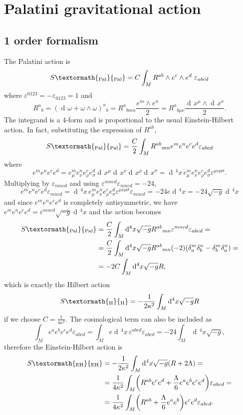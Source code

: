\documentclass[a4paper,12pt]{book}
\newcommand{\ped}[1]{\textormath{\textsubscript{#1}}{_{\mathrm{#1}}}}
\newcommand{\ap}[1]{\textormath{\textsuperscript{#1}}{^{\mathrm{#1}}}}
\newcommand{\dd}{\mathop{\mathrm{d}\!}{}}
\theoremstyle{definition}
\theoremstyle{remark}
\begin{document}
\section{Palatini gravitational action}
\subsection{1\ap{st} order formalism}
\label{subsec:pal1vierbein}
The Palatini action is 
\[S\ped{Pal}=C\int_MR^{ab}\wedge e^c\wedge e^d\ \varepsilon_{abcd}\]
where $\varepsilon^{0123}=-\varepsilon_{0123}=1$ and
\[R^a{}_b=(\dd\omega+\omega\wedge\omega)^a{}_b=R^a{}_{bmn}\frac{e^m\wedge e^n}{2}=R^a{}_{b\mu\nu}\frac{\dd x^\mu\wedge\dd x^\nu}{2}.\]
The integrand is a 4-form and is proportional to the usual Einstein-Hilbert action. In fact, substituting the expression of $R^{ab}$,
\[S\ped{Pal}=\frac{C}{2}\int_MR^{ab}{}_{mn}e^me^ne^ce^d\varepsilon_{abcd}\]
where
\[e^me^ne^ce^d=e^m_\mu e^n_\nu e^c_\rho e^d_\sigma\dd x^\mu\dd x^\nu\dd x^\rho\dd x^\sigma=\dd^4x\,e^m_\mu e^n_\nu e^c_\rho e^d_\sigma \varepsilon^{\mu\nu\rho\sigma}.\]
Multiplying by $\varepsilon_{mncd}$ and using $\varepsilon^{mncd}\varepsilon_{mncd}=-24$,
\[e^me^ne^ce^d\varepsilon_{mncd}=\dd^4x\,e^m_\mu e^n_\nu e^c_\rho e^d_\sigma \varepsilon^{\mu\nu\rho\sigma}\varepsilon_{mncd}=-24e\dd^4 x=-24\sqrt{-g}\dd^4x\]
and since $e^me^ne^ce^d$ is completely antisymmetric, we have $e^me^ne^ce^d=\varepsilon^{mncd}\sqrt{-g}\dd^4x$ and the action becomes
\begin{align*}
S\ped{Pal}&=\frac{C}{2}\int_M\dd^4x\sqrt{-g}R^{ab}{}_{mn}\varepsilon^{mncd}\varepsilon_{abcd}=\\
&=\frac{C}{2}\int_M\dd^4x\sqrt{-g}R^{ab}{}_{mn}(-2)(\delta^m_a\delta^n_b-\delta^m_b\delta^n_a)=\\
&=-2C\int_M\dd^4x\sqrt{-g}R,
\end{align*}
which is exactly the Hilbert action
\[S\ped{H}=-\frac{1}{2\kappa^2}\int_M\dd^4x\sqrt{-g}R\]
if we choose $C=\frac{1}{4\kappa^2}$. The cosmological term can also be included as
\[\int_Me^ae^be^ce^d\varepsilon_{abcd}=\int_M e\dd^4x\,\varepsilon^{abcd}\varepsilon_{abcd}=-24\int_M\dd^4x\sqrt{-g},\]
therefore the Einstein-Hilbert action is
\begin{align}
\label{eqn:palatinieh}
S\ped{EH}&=-\frac{1}{2\kappa^2}\int_M\dd^4x\sqrt{-g}(R+2\Lambda)=\\
&=\frac{1}{4\kappa^2}\int_M\biggl(R^{ab}e^ce^d+\frac{\Lambda}{6}e^ae^be^ce^d\biggr)\varepsilon_{abcd}=\\
&=\frac{1}{4\kappa^2}\int_M\biggl(R^{ab}+\frac{\Lambda}{6}e^ae^b\biggr)e^ce^d\varepsilon_{abcd}.
\end{align}
\end{document}
